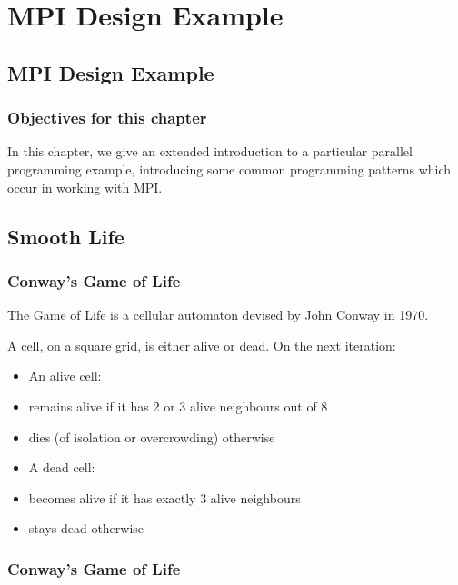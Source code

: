\section{MPI Design Example}\label{mpi-design-example}

\subsection{MPI Design Example}\label{mpi-design-example-1}

\subsubsection{Objectives for this
chapter}\label{objectives-for-this-chapter}

In this chapter, we give an extended introduction to a particular
parallel programming example, introducing some common programming
patterns which occur in working with MPI.

\subsection{Smooth Life}\label{smooth-life}

\subsubsection{Conway's Game of Life}\label{conways-game-of-life}

The Game of Life is a cellular automaton devised by John Conway in 1970.

A cell, on a square grid, is either alive or dead. On the next
iteration:

\begin{itemize}
\itemsep1pt\parskip0pt
\item
  An alive cell:
\item
  remains alive if it has 2 or 3 alive neighbours out of 8
\item
  dies (of isolation or overcrowding) otherwise
\item
  A dead cell:
\item
  becomes alive if it has exactly 3 alive neighbours
\item
  stays dead otherwise
\end{itemize}

\subsubsection{Conway's Game of Life}\label{conways-game-of-life-1}

